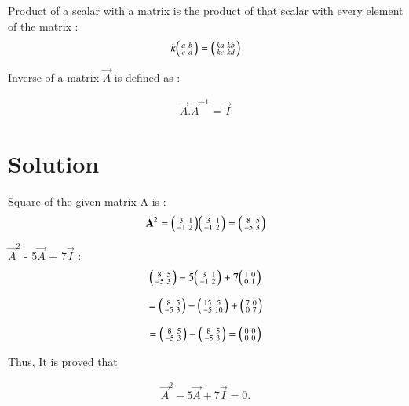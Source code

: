 \documentclass[journal,12pt,twocolumn]{IEEEtran}
\begin{document}
Product of a scalar with a matrix is the product of that scalar with every element of the matrix : 
\begin{align}
 k\begin{psmallmatrix} a & b\\c & d\end{psmallmatrix}  = \begin{psmallmatrix} ka & kb\\kc & kd\end{psmallmatrix}  
\end{align}

Inverse of a matrix $\vec{A}$ is defined as  :
  
\begin{align}
    \vec{A} . \vec{A}^{-1} = \vec{I}
\end{align}

\section{Solution}


Square of the given matrix A is : 
\begin{align}
   \mathbf{A}^2  = \begin{psmallmatrix} 3 & 1\\ -1 & 2\end{psmallmatrix}  \begin{psmallmatrix} 3 & 1\\ -1 & 2\end{psmallmatrix} =   \begin{psmallmatrix} 8 & 5\\ -5 & 3\end{psmallmatrix} 
\end{align}

$\vec{A}^2$ - 5$\vec{A}$ + 7$\vec{I}$ :
\begin{align}
  \begin{psmallmatrix} 8 & 5\\ -5 & 3\end{psmallmatrix} -  5\begin{psmallmatrix} 3 & 1\\ -1 & 2\end{psmallmatrix} + 7\begin{psmallmatrix} 1 & 0\\ 0 & 1\end{psmallmatrix}
\end{align}

\begin{align}
 =   \begin{psmallmatrix} 8 & 5\\ -5 & 3\end{psmallmatrix} -  \begin{psmallmatrix} 15 & 5\\ -5 & 10\end{psmallmatrix} + \begin{psmallmatrix} 7 & 0\\ 0 & 7\end{psmallmatrix}
\end{align}

\begin{align}
 =   \begin{psmallmatrix} 8 & 5\\ -5 & 3\end{psmallmatrix} - \begin{psmallmatrix} 8 & 5\\ -5 & 3\end{psmallmatrix} = \begin{psmallmatrix} 0 & 0\\ 0 & 0\end{psmallmatrix} 
\end{align}

Thus, It is proved that

\begin{align}
\vec{A}^2 - 5\vec{A} + 7\vec{I} = 0.  
\end{align}
\end{document}
